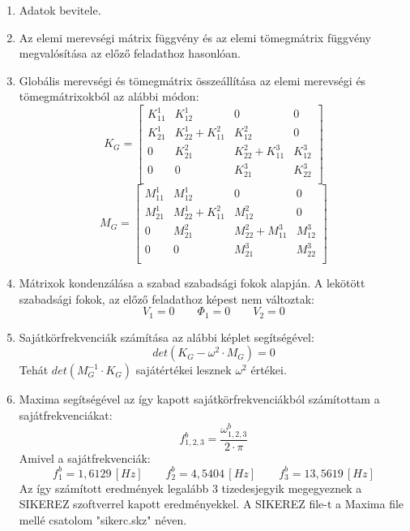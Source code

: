 \documentclass[12pt,a4paper] {article}
\begin{document}
\begin{enumerate}
	\item Adatok bevitele.
	\item Az elemi merevségi mátrix függvény és az elemi tömegmátrix függvény megvalósítása az előző feladathoz hasonlóan.
	\item Globális merevségi és tömegmátrix összeállítása az elemi merevségi és tömegmátrixokból az alábbi módon:
	\[K_G=
	\begin{bmatrix}
	K_{11}^1 &K_{12}^1 &0 &0 \\
	K_{21}^1 &K_{22}^1+K_{11}^2 &K_{12}^2 &0 \\
	0 &K_{21}^2 &K_{22}^2+K_{11}^3 &K_{12}^3 \\
	0 &0 &K_{21}^3 &K_{22}^3 \\
	\end{bmatrix}
	\] 
	\[M_G=
	\begin{bmatrix}
	M_{11}^1 &M_{12}^1 &0 &0 \\
	M_{21}^1 &M_{22}^1+K_{11}^2 &M_{12}^2 &0 \\
	0 &M_{21}^2 &M_{22}^2+M_{11}^3 &M_{12}^3 \\
	0 &0 &M_{21}^3 &M_{22}^3 \\
	\end{bmatrix}
	\]  
	\item Mátrixok kondenzálása a szabad szabadsági fokok alapján. A lekötött szabadsági fokok, az előző feladathoz képest nem változtak:
	\[V_{1}=0 \qquad \Phi_{1}=0 \qquad V_{2}=0\]
	\newpage
	\item Sajátkörfrekvenciák számítása az alábbi képlet segítségével:
	\[det(K_G-\omega^2 \cdot M_G)=0\]
	Tehát \(det(M_G^{-1} \cdot K_G)\) sajátértékei lesznek $\omega^2$ értékei.
	\item Maxima segítségével az így kapott sajátkörfrekvenciákból számítottam a sajátfrekvenciákat:
	\[f_{1,2,3}^b=\dfrac{\omega_{1,2,3}^b}{2\cdot \pi}\]
	Amivel a sajátfrekvenciák:
	\[f_1^b=1,6129\, [Hz] \qquad f_2^b=4,5404\, [Hz] \qquad f_3^b=13,5619\, [Hz]  \]
	Az így számított eredmények legalább 3 tizedesjegyik megegyeznek a SIKEREZ szoftverrel kapott eredményekkel. A SIKEREZ file-t a Maxima file mellé csatolom "sikerc.skz" néven.
\end{enumerate}\par


\end{document}
